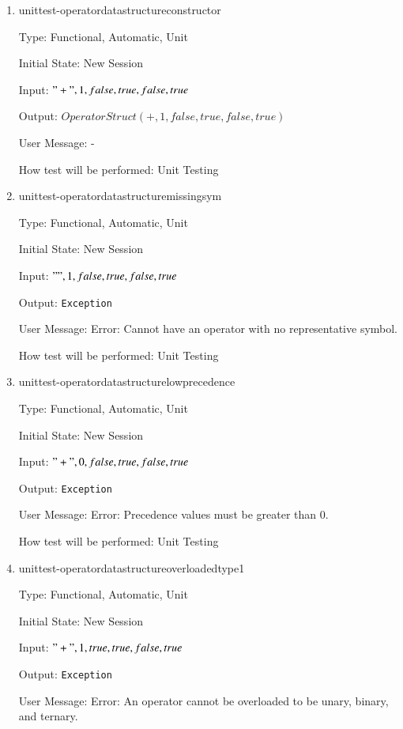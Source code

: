 \documentclass[12pt, titlepage]{article}
\begin{document}
\begin{enumerate}
	
	\item{unittest-operatordatastructureconstructor}
	
	Type: Functional, Automatic, Unit
	
	Initial State: New Session
	
	Input: $"+", 1, false, true, false, true$
	
	Output: $OperatorStruct(+,1,false,true,false,true)$
	
	User Message: - 
	
	How test will be performed: Unit Testing\\
	
	\item{unittest-operatordatastructuremissingsym}
	
	Type: Functional, Automatic, Unit
	
	Initial State: New Session
	
	Input: $"", 1, false, true, false, true$
	
	Output: \texttt{Exception}
	
	User Message: Error: Cannot have an operator with no representative symbol.
	
	How test will be performed: Unit Testing\\
	
	\item{unittest-operatordatastructurelowprecedence}
	
	Type: Functional, Automatic, Unit
	
	Initial State: New Session
	
	Input: $"+", 0, false, true, false, true$
	
	Output: \texttt{Exception}
	
	User Message: Error: Precedence values must be greater than 0.
	
	How test will be performed: Unit Testing\\
	
	\item{unittest-operatordatastructureoverloadedtype1}
	
	Type: Functional, Automatic, Unit
	
	Initial State: New Session
	
	Input: $"+", 1, true, true, false, true$
	
	Output: \texttt{Exception}
	
	User Message: Error: An operator cannot be overloaded to be unary, binary, 
	and ternary.
	

\end{enumerate}
\end{document}
